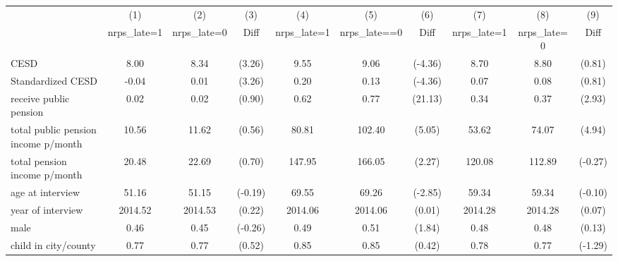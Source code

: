 \begin{tabular}{lccccccccc}
                    &\multicolumn{1}{c}{(1)}&\multicolumn{1}{c}{(2)}&\multicolumn{1}{c}{(3)}&\multicolumn{1}{c}{(4)}&\multicolumn{1}{c}{(5)}&\multicolumn{1}{c}{(6)}&\multicolumn{1}{c}{(7)}&\multicolumn{1}{c}{(8)}&\multicolumn{1}{c}{(9)}\\
                    &\multicolumn{1}{c}{nrps\_late=1}&\multicolumn{1}{c}{nrps\_late=0}&\multicolumn{1}{c}{Diff}&\multicolumn{1}{c}{nrps\_late=1}&\multicolumn{1}{c}{nrps\_late==0}&\multicolumn{1}{c}{Diff}&\multicolumn{1}{c}{nrps\_late=1}&\multicolumn{1}{c}{nrps\_late= 0}&\multicolumn{1}{c}{Diff}\\
\hline
CESD            &        8.00&        8.34&      (3.26)\sym{**} &        9.55&        9.06&     (-4.36)\sym{***}&        8.70&        8.80&      (0.81)         \\
Standardized CESD&       -0.04&        0.01&      (3.26)\sym{**} &        0.20&        0.13&     (-4.36)\sym{***}&        0.07&        0.08&      (0.81)         \\
receive public pension &        0.02&        0.02&      (0.90)         &        0.62&        0.77&     (21.13)\sym{***}&        0.34&        0.37&      (2.93)\sym{**} \\
total public pension income p/month&       10.56&       11.62&      (0.56)         &       80.81&      102.40&      (5.05)\sym{***}&       53.62&       74.07&      (4.94)\sym{***}\\
total pension income p/month&       20.48&       22.69&      (0.70)         &      147.95&      166.05&      (2.27)\sym{*}  &      120.08&      112.89&     (-0.27)         \\
age at interview    &       51.16&       51.15&     (-0.19)         &       69.55&       69.26&     (-2.85)\sym{**} &       59.34&       59.34&     (-0.10)         \\
year of interview &     2014.52&     2014.53&      (0.22)         &     2014.06&     2014.06&      (0.01)         &     2014.28&     2014.28&      (0.07)         \\
male                &        0.46&        0.45&     (-0.26)         &        0.49&        0.51&      (1.84)         &        0.48&        0.48&      (0.13)         \\
child in city/county&        0.77&        0.77&      (0.52)         &        0.85&        0.85&      (0.42)         &        0.78&        0.77&     (-1.29)         \\

\end{tabular}
